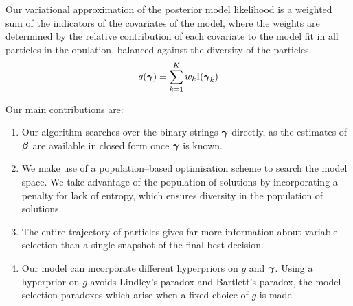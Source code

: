 Our variational approximation of the posterior model likelihood is a weighted sum of the indicators of the
covariates of the model, where the weights are determined by the relative contribution of each covariate to
the model fit in all particles in the opulation, balanced against the diversity of the particles.
\[
	q({\boldsymbol \gamma}) = \sum_{k=1}^K w_k \text{I}({\boldsymbol \gamma}_k)
\]


Our main contributions are:

\begin{enumerate}
	\item Our algorithm searches over the binary strings ${\boldsymbol \gamma}$ directly, as the estimates of ${\boldsymbol \beta}$ are available 
	in closed form once ${\boldsymbol \gamma}$ is known.

	\item We make use of a population--based optimisation scheme to search the model space. We take advantage of the
	population of solutions by incorporating a penalty for lack of entropy, which ensures diversity in the
	population of solutions.

	\item The entire trajectory of particles gives far more information about variable selection than a single
	snapshot of the final best decision.

	\item Our model can incorporate different hyperpriors on $g$ and ${\boldsymbol \gamma}$. Using a hyperprior on $g$
				avoids Lindley's paradox and Bartlett's paradox, the model selection paradoxes which arise when a
				fixed choice of $g$ is made.
\end{enumerate}





